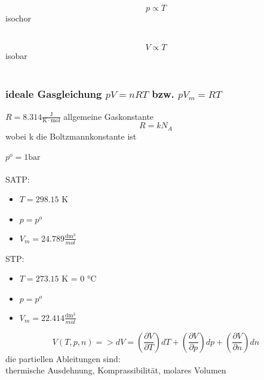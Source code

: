 \documentclass[a4paper, fleqn]{article}
\begin{document}
\begin{equation*}
    p \varpropto T
\end{equation*}
isochor\newpage
{}\\
\begin{equation*}
    V \varpropto T
\end{equation*}
isobar\\\\
\subsubsection{ideale Gasgleichung $pV = nRT$ bzw. $pV_m = RT$}
$R = 8.314 \frac{\mathrm{J}}{\mathrm{K} \cdot \mathrm{mol}}$ allgemeine Gaskonstante\\
\begin{equation*}
    R = k N_A
\end{equation*}
wobei k die Boltzmannkonstante ist\\\\
$p^o = 1 \mathrm{bar}$\\\\
SATP:
\begin{itemize}
    \item $T=298.15$ K
    \item $p = p^o$
    \item $V_m = 24.789 \frac{\mathrm{dm^3}}{ mol}$
\end{itemize}
STP:
\begin{itemize}
    \item $T=273.15$ K = $0$ °C
    \item $p = p^o$
    \item $V_m = 22.414 \frac{\mathrm{dm^3}}{ mol}$
\end{itemize}
\begin{equation*}
    V(T,p,n) => dV=\left(\frac{\partial V}{\partial T}\right)dT+\left(\frac{\partial V}{\partial p}\right)dp+\left(\frac{\partial V}{\partial n}\right)dn
\end{equation*}
die partiellen Ableitungen sind:\\
thermische Ausdehnung, Komprassibilität, molares Volumen\\
\end{document}
